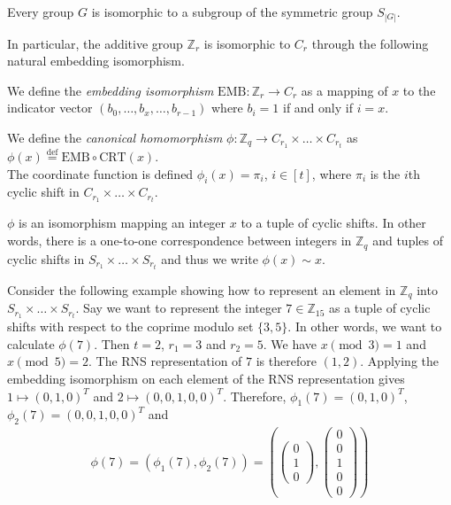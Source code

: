 \begin{theorem}
    Every group $G$ is isomorphic to a subgroup of the symmetric group $S_{|G|}$.
\end{theorem}
In particular, the additive group $\mathbb{Z}_r$ is isomorphic to $C_r$ through the following natural embedding isomorphism.
\begin{definition}
    We define the \textit{embedding isomorphism} $\textrm{EMB} \colon \mathbb{Z}_r \rightarrow C_r$ as a mapping of $x$ to the indicator vector $(b_0, \dots, b_x, \dots, b_{r-1})$ where $b_i = 1$ if and only if $i = x$.
\end{definition}

\begin{definition}\label{def:canonical-homomorphism}
    We define the \textit{canonical homomorphism} $\phi \colon \mathbb{Z}_q \to C_{r_1} \times \dots \times C_{r_t}$ as $\phi(x) \stackrel{\mathrm{def}}{=} \textrm{EMB} \circ \textrm{CRT} (x)$.\\
    The coordinate function is defined $\phi_i(x) = \pi_i$, $i \in [t]$, where $\pi_i$ is the $i$th cyclic shift in $C_{r_1} \times \dots \times C_{r_t}$.
\end{definition}

$\phi$ is an isomorphism mapping an integer $x$ to a tuple of cyclic shifts. In other words, there is a one-to-one correspondence between integers in $\mathbb{Z}_q$ and tuples of cyclic shifts in $S_{r_1} \times \dots \times S_{r_t}$ and thus we write $\phi(x) \sim x$.

Consider the following example showing how to represent an element in $\mathbb{Z}_q$ into $S_{r_1} \times \dots \times S_{r_t}$.
Say we want to represent the integer $7 \in \mathbb{Z}_{15}$ as a tuple of cyclic shifts with respect to the coprime modulo set $\{3,5\}$. In other words, we want to calculate $\phi(7)$. Then $t = 2$, $r_1 = 3$ and $r_2 = 5$. We have $x \pmod 3 = 1$ and $x \pmod 5 = 2$. The RNS representation of $7$ is therefore $(1,2)$. Applying the embedding isomorphism on each element of the RNS representation gives $1 \mapsto (0,1,0)^T$ and $2 \mapsto (0,0,1,0,0)^T$. Therefore, $\phi_1(7) = (0,1,0)^T$, $\phi_2(7) = (0,0,1,0,0)^T$ and
\begin{equation*}
    \begin{aligned}
        \phi(7) = (\phi_1(7), \phi_2(7)) = (\begin{pmatrix}
            0 \\
            1 \\
            0
        \end{pmatrix}, \begin{pmatrix}
            0 \\
            0 \\
            1 \\
            0 \\
            0
        \end{pmatrix})
    \end{aligned}
\end{equation*}

